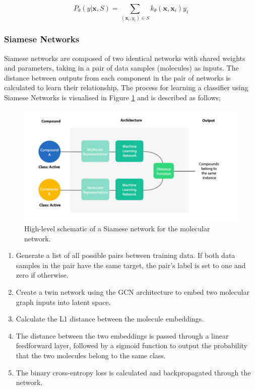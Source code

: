 \begin{equation}
    \label{kernel}
    P_\theta(y \vert \mathbf{x}, S) = \sum_{(\mathbf{x}_i, y_i) \in S} k_\theta(\mathbf{x}, \mathbf{x}_i)y_i
\end{equation}

\subsubsection{Siamese Networks}

Siamese networks \citep{koch2015siamese} are composed of two identical networks with shared weights and parameters, taking in a pair of data samples (molecules) as inputs. The distance between outputs from each component in the pair of networks is calculated to learn their relationship. The process for learning a classifier using Siamese Networks is visualised in Figure \ref{fig:siamesenetarchi} and is described as follows;

\begin{figure}[h]
    \centering
    \includegraphics[width=0.9\linewidth]{img/high-level siamese.png}
    \caption[High-level schematic of Siamese network]{High-level schematic of a Siamese network for the molecular network.}
    \label{fig:siamesenetarchi}
\end{figure}

\begin{enumerate}
    \item Generate a list of all possible pairs between training data. If both data samples in the pair have the same target, the pair's label is set to one and zero if otherwise.
    \item Create a twin network using the GCN architecture to embed two molecular graph inputs into latent space.
    \item Calculate the L1 distance between the molecule embeddings. 
    \item The distance between the two embeddings is passed through a linear feedforward layer, followed by a sigmoid function to output the probability that the two molecules belong to the same class.
    \item The binary cross-entropy loss is calculated and backpropagated through the network.
\end{enumerate}

